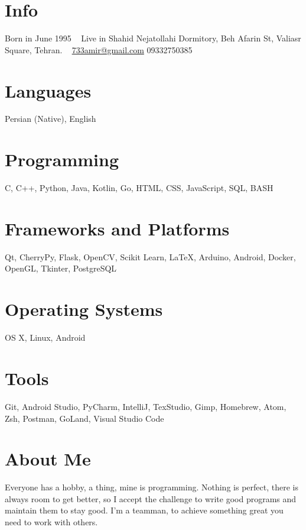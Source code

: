 \documentclass[]{friggeri-cv}
\begin{document}


\begin{aside}	
  \section{Info}
    Born in June 1995
    ~
    Live in Shahid Nejatollahi Dormitory, Beh Afarin St, Valiasr Square, Tehran.
    ~
    \href{mailto:733amir@gmail.com}{733amir@gmail.com}
    09332750385
  \section{Languages}
    Persian (Native),
    English
  \section{Programming}
	C, C++, Python, Java, Kotlin, Go, HTML, CSS, JavaScript, SQL, BASH
  \section{Frameworks and Platforms}
    Qt, CherryPy, Flask, OpenCV, Scikit Learn, LaTeX, Arduino, Android, Docker, OpenGL, Tkinter, PostgreSQL
  \section{Operating Systems}
  OS X, Linux, Android
  \section{Tools}
  Git, Android Studio, PyCharm, IntelliJ, TexStudio, Gimp, Homebrew, Atom, Zsh, Postman, GoLand, Visual Studio Code
\end{aside}

\section{About Me}


Everyone has a hobby, a thing, mine is programming. Nothing is perfect, there is always room to get better, so I accept the challenge to write good programs and maintain them to stay good. I'm a teamman, to achieve something great you need to work with others.
\end{document}

